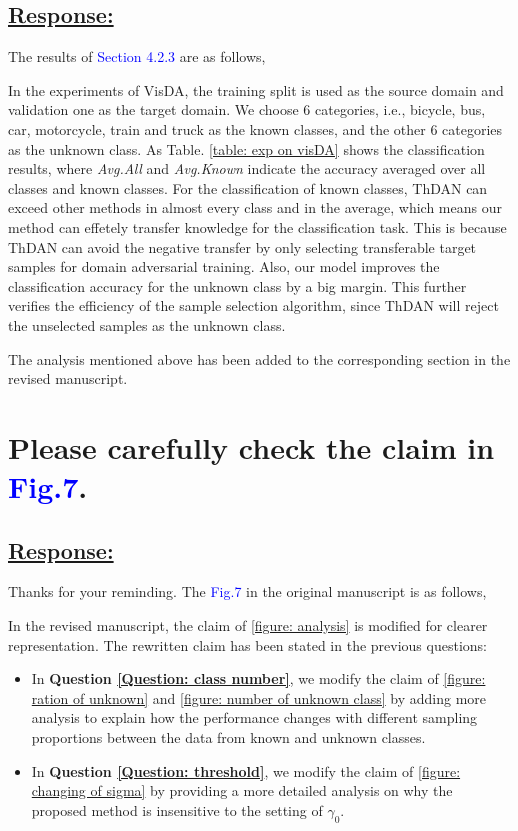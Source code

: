 {\subsection*{\underline{\textbf{Response:}}}

The results of \textcolor{blue}{Section 4.2.3} are as follows,


In the experiments of VisDA, the training split is used as the source domain and validation one as the target domain.
We choose 6 categories, i.e., bicycle, bus, car, motorcycle, train and truck as the known classes, and the other 6 categories as the unknown class.
As Table. \ref{table: exp on visDA} shows the classification results, where \textit{Avg.All} and \textit{Avg.Known} indicate the accuracy averaged over all classes and known classes.
For the classification of known classes, ThDAN can exceed other methods in almost every class and in the average, which means our method can effetely transfer knowledge for the classification task.
This is because ThDAN can avoid the negative transfer by only selecting transferable target samples for domain adversarial training.
Also, our model improves the classification accuracy for the unknown class by a big margin.
This further verifies the efficiency of the sample selection algorithm, since ThDAN will reject the unselected samples as the unknown class.

The analysis mentioned above has been added to the corresponding section in the revised manuscript.

\section{Please carefully check the claim in \textcolor{blue}{Fig.7}.}
\subsection*{\underline{\textbf{Response:}}}

Thanks for your reminding.
The \textcolor{blue}{Fig.7} in the original manuscript is as follows,


In the revised manuscript, the claim of \figurename{\ref{figure: analysis}} is modified for clearer representation.
The rewritten claim has been stated in the previous questions:
\begin{itemize}
    \item  In \textbf{Question \ref{Question: class number}}, we modify the claim of \figurename{\ref{figure: ration of unknown}} and \ref{figure: number of unknown class} by adding more analysis to explain how the performance changes with different sampling proportions between the data from known and unknown classes. 
    \item In \textbf{Question \ref{Question: threshold}}, we modify the claim of \figurename{\ref{figure: changing of sigma}} by providing a more detailed analysis on why the proposed method is insensitive to the setting of $\gamma_0$. 
\end{itemize}


}
